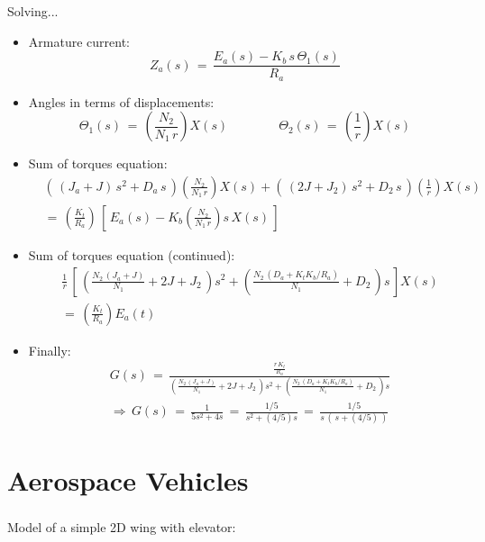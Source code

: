 \documentclass[ 10pt, xcolor = dvipsnames]{beamer}
\begin{document}
\begin{frame}[allowframebreaks]
Solving...
\begin{itemize}
\item Armature current:
\[
Z_a(s) \, = \, \frac{ E_a(s) - K_b \, s \, \Theta_1(s) }{R_a}
\]
\item Angles in terms of displacements:
\[
\Theta_1(s) \, = \, \left( \frac{N_2}{N_1 \, r} \right) X(s) \qquad \qquad
\Theta_2(s) \, = \, \left( \frac{1}{r} \right) X(s)
\]
\item Sum of torques equation: 
\begin{align*}
& ( \, ( J_a + J ) \, s^2 + D_a \, s \, )\left( \frac{N_2}{N_1 \, r} \right) X(s) + 
( \, ( 2J + J_2 ) \, s^2 + D_2 \, s \, ) \left( \frac{1}{r} \right) X(s) \\
& = \, \left( \frac{K_t}{R_a} \right) \, \left[ \, E_a(s) - K_b \left( \frac{N_2}{N_1 \, r} \right) s \, X(s) \, \right]
\end{align*}
\framebreak
\item Sum of torques equation (continued):
\begin{align*}
& \frac{1}{r} \, \left[ \,
\left( \frac{N_2 \, ( J_a + J )}{N_1} + 2J + J_2 \, \right) s^2 + 
\left( \frac{N_2 \, ( D_a + K_t K_b / R_a )}{N_1} + D_2 \, \right) s \, \right] X(s) \\
& = \, \left( \frac{K_t}{R_a} \right) E_a(t)
\end{align*}
\item Finally:
\begin{align*}
& G(s) \, = \,
\frac{ \frac{r \, K_t}{R_a} }{
\left( \frac{N_2 \, ( J_a + J )}{N_1} + 2J + J_2 \, \right) s^2 + 
\left( \frac{N_2 \, ( D_a + K_t K_b / R_a )}{N_1} + D_2 \, \right) s } \\
& \Longrightarrow \, G(s)
\, = \, \frac{1}{ 5 s^2 + 4s } 
\, = \, \frac{1/5}{ s^2 + (4/5)s } 
\, = \, \frac{1/5}{ s \, ( \, s + (4/5) \, ) }
\end{align*}
\end{itemize}

\end{frame}

\section{Aerospace Vehicles}

\begin{frame}[allowframebreaks]
\frametitle{\insertsection}

Model of a simple 2D wing with elevator:
\begin{figure}[htb]
\centering
\def\svgwidth{0.9\columnwidth}

\end{figure}

\end{frame}
\end{document}
